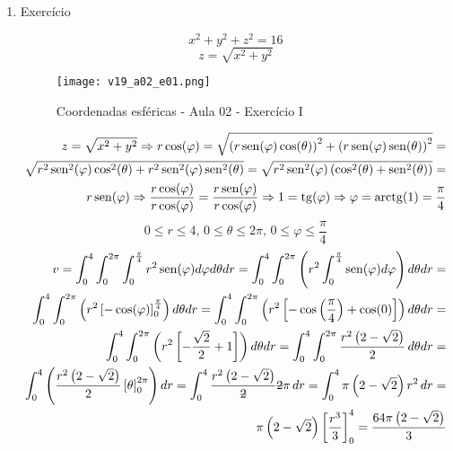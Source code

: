 \begin{enumerate}
	\item Exercício
	
	\begin{equation*}
		x^2 + y^2 + z^2 = 16
	\end{equation*}
	\begin{equation*}
		z = \sqrt{x^2 + y^2}
	\end{equation*}
	
	\begin{figure}[htb]
		\caption{Coordenadas esféricas - Aula 02 - Exercício I}
		\label{v19_a02_e01}
		\centering
		\texttt{[image: v19\_a02\_e01.png]}		
	\end{figure}
	
	\begin{align*}
		z = \sqrt{x^2 + y^2} \Rightarrow r\cos(\varphi) = \sqrt{\left(r\operatorname{sen}(\varphi)\cos(\theta)\right)^2 + \left(r\operatorname{sen}(\varphi)\operatorname{sen}(\theta)\right)^2} =\\ \sqrt{r^2\operatorname{sen}^2(\varphi)\cos^2(\theta) + r^2\operatorname{sen}^2(\varphi)\operatorname{sen}^2(\theta)} = \sqrt{r^2\operatorname{sen}^2(\varphi)\left(\cos^2(\theta) + \operatorname{sen}^2(\theta)\right)} =\\ r\operatorname{sen}(\varphi) \Rightarrow \dfrac{r\cos(\varphi)}{r\cos(\varphi)} = \dfrac{r\operatorname{sen}(\varphi)}{r\cos(\varphi)} \Rightarrow 1 = \operatorname{tg}(\varphi) \Rightarrow \varphi = \operatorname{arctg}(1) = \dfrac{\pi}{4}
	\end{align*}
	\begin{equation*}
		0 \leq r \leq 4,\, 0 \leq \theta \leq 2\pi,\, 0 \leq \varphi \leq \dfrac{\pi}{4}
	\end{equation*}
	\begin{align*}
		v = \int_0^4 \int_0^{2\pi} \int_0^{\frac{\pi}{4}} r^2\sen(\varphi) d\varphi d\theta dr = \int_0^4 \int_0^{2\pi}\left(r^2\int_0^{\frac{\pi}{4}} \sen(\varphi) d\varphi\right)d\theta dr =\\ \int_0^4 \int_0^{2\pi}\left(r^2\left[-\cos(\varphi)\right]_0^{\frac{\pi}{4}}\right)d\theta dr = \int_0^4 \int_0^{2\pi}\left(r^2\left[-\cos\left(\dfrac{\pi}{4}\right) + \cos(0)\right]\right)d\theta dr =\\ \int_0^4 \int_0^{2\pi}\left(r^2\left[-\dfrac{\sqrt{2}}{2} + 1\right]\right)d\theta dr = \int_0^4 \int_0^{2\pi} \dfrac{r^2\left(2 - \sqrt{2}\right)}{2}\, d\theta dr =\\ \int_0^4 \left(\dfrac{r^2\left(2 - \sqrt{2}\right)}{2}\left[\theta\right]_0^{2\pi}\right) dr = \int_0^4 \dfrac{r^2\left(2 - \sqrt{2}\right)}{\overstrike{2}}\overstrike{2}\pi\, dr = \int_0^4 \pi\left(2 - \sqrt{2}\right)r^2\, dr =\\ \pi\left(2 - \sqrt{2}\right) \left[\dfrac{r^3}{3}\right]_0^4 = \dfrac{64\pi\left(2 - \sqrt{2}\right)}{3}
	\end{align*}
\end{enumerate}